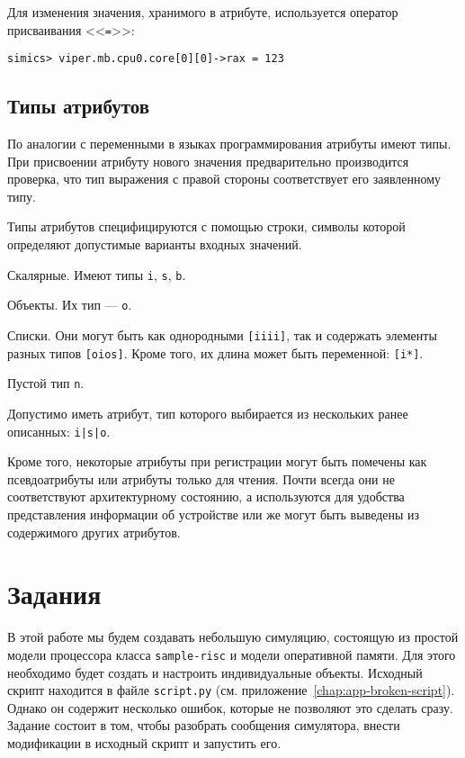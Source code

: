 Для изменения значения, хранимого в атрибуте, используется оператор присваивания <<\texttt{=}>>:
\begin{lstlisting}
simics> viper.mb.cpu0.core[0][0]->rax = 123
\end{lstlisting}

\subsection{Типы атрибутов}

По аналогии с переменными в языках программирования атрибуты имеют типы. При присвоении атрибуту нового значения предварительно производится проверка, что тип выражения с правой стороны соответствует его заявленному типу.

Типы атрибутов специфицируются с помощью строки, символы которой определяют допустимые варианты входных значений.

\begin{enumerate*}
\item Скалярные. Имеют типы \texttt{i}, \texttt{s}, \texttt{b}.
\item Объекты. Их тип --- \texttt{o}.
\item Списки. Они могут быть как однородными \texttt{[iiii]}, так и содержать элементы разных типов \texttt{[oios]}. Кроме того, их длина может быть переменной: \texttt{[i*]}.
\item Пустой тип \texttt{n}.
\item Допустимо иметь атрибут, тип которого выбирается из нескольких ранее описанных: \texttt{i|s|o}.

\end{enumerate*}

Кроме того, некоторые атрибуты при регистрации могут быть помечены как псевдоатрибуты или атрибуты только для чтения. Почти всегда они не соответствуют архитектурному состоянию, а используются для удобства представления информации об устройстве или же могут быть выведены из содержимого других атрибутов.

\section{Задания}

 В этой работе мы будем создавать небольшую симуляцию, состоящую из простой модели процессора класса \texttt{sample-risc} и модели оперативной памяти. Для этого необходимо будет создать и настроить индивидуальные объекты. Исходный скрипт находится в файле \texttt{script.py} (см. приложение~\ref{chap:app-broken-script}). Однако он содержит несколько ошибок, которые не позволяют это сделать сразу. Задание состоит в том, чтобы разобрать сообщения симулятора, внести модификации в исходный скрипт и запустить его.

